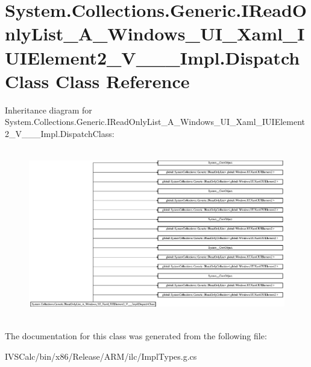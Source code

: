 \hypertarget{class_system_1_1_collections_1_1_generic_1_1_i_read_only_list___a___windows___u_i___xaml___i_u_id2e76fdcbd7675cb45ba50e44d8fd051}{}\section{System.\+Collections.\+Generic.\+I\+Read\+Only\+List\+\_\+\+A\+\_\+\+Windows\+\_\+\+U\+I\+\_\+\+Xaml\+\_\+\+I\+U\+I\+Element2\+\_\+\+V\+\_\+\+\_\+\+\_\+\+Impl.\+Dispatch\+Class Class Reference}
\label{class_system_1_1_collections_1_1_generic_1_1_i_read_only_list___a___windows___u_i___xaml___i_u_id2e76fdcbd7675cb45ba50e44d8fd051}
Inheritance diagram for System.\+Collections.\+Generic.\+I\+Read\+Only\+List\+\_\+\+A\+\_\+\+Windows\+\_\+\+U\+I\+\_\+\+Xaml\+\_\+\+I\+U\+I\+Element2\+\_\+\+V\+\_\+\+\_\+\+\_\+\+Impl.\+Dispatch\+Class\+:\begin{figure}[H]
\begin{center}
\leavevmode
\includegraphics[height=7.491639cm]{class_system_1_1_collections_1_1_generic_1_1_i_read_only_list___a___windows___u_i___xaml___i_u_id2e76fdcbd7675cb45ba50e44d8fd051}
\end{center}
\end{figure}


The documentation for this class was generated from the following file\+:\begin{DoxyCompactItemize}
\item 
I\+V\+S\+Calc/bin/x86/\+Release/\+A\+R\+M/ilc/Impl\+Types.\+g.\+cs\end{DoxyCompactItemize}
